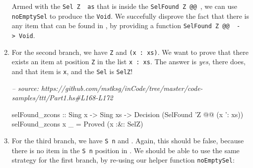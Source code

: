 \documentclass[]{article}
\newenvironment{Shaded}{}{}
\newcommand{\CommentTok}[1]{\textcolor[rgb]{0.38,0.63,0.69}{\textit{#1}}}
\newcommand{\DataTypeTok}[1]{\textcolor[rgb]{0.56,0.13,0.00}{#1}}
\newcommand{\FunctionTok}[1]{\textcolor[rgb]{0.02,0.16,0.49}{#1}}
\newcommand{\NormalTok}[1]{#1}
\newcommand{\OtherTok}[1]{\textcolor[rgb]{0.00,0.44,0.13}{#1}}
\begin{document}
\begin{enumerate}
\begin{Shaded}
\end{Shaded}

  Armed with the \texttt{Sel\ \textquotesingle{}Z\ \textquotesingle{}{[}{]}\ as}
  that is inside the
  \texttt{SelFound\ \textquotesingle{}Z\ @@\ \textquotesingle{}{[}{]}}, we can
  use \texttt{noEmptySel} to produce the \texttt{Void}. We succefully disprove
  the fact that there is any item that can be found in
  \texttt{\textquotesingle{}{[}{]}}, by providing a function
  \texttt{SelFound\ \textquotesingle{}Z\ @@\ \textquotesingle{}{[}{]}\ -\textgreater{}\ Void}.
\item
  For the second branch, we have \texttt{\textquotesingle{}Z} and
  \texttt{(x\ \textquotesingle{}:\ xs)}. We want to prove that there exists an
  item at position \texttt{\textquotesingle{}Z} in the list
  \texttt{x\ \textquotesingle{}:\ xs}. The answer is \emph{yes}, there does, and
  that item is \texttt{x}, and the \texttt{Sel} is \texttt{SelZ}!

\begin{Shaded}
\begin{Highlighting}[]
\CommentTok{-- source: https://github.com/mstksg/inCode/tree/master/code-samples/ttt/Part1.hs#L168-L172}

\NormalTok{selFound_zcons}
\OtherTok{    ::} \DataTypeTok{Sing}\NormalTok{ x}
    \OtherTok{->} \DataTypeTok{Sing}\NormalTok{ xs}
    \OtherTok{->} \DataTypeTok{Decision}\NormalTok{ (}\DataTypeTok{SelFound}\NormalTok{ '}\DataTypeTok{Z} \FunctionTok{@@}\NormalTok{ (x '}\FunctionTok{:}\NormalTok{ xs))}
\NormalTok{selFound_zcons x _ }\FunctionTok{=} \DataTypeTok{Proved}\NormalTok{ (x }\FunctionTok{:&:} \DataTypeTok{SelZ}\NormalTok{)}
\end{Highlighting}
\end{Shaded}
\item
  For the third branch, we have \texttt{\textquotesingle{}S\ n} and
  \texttt{\textquotesingle{}{[}{]}}. Again, this should be false, because there
  is no item in the \texttt{\textquotesingle{}S\ n} position in
  \texttt{\textquotesingle{}{[}{]}}. We should be able to use the same strategy
  for the first branch, by re-using our helper function \texttt{noEmptySel}:


\end{enumerate}
\end{document}
